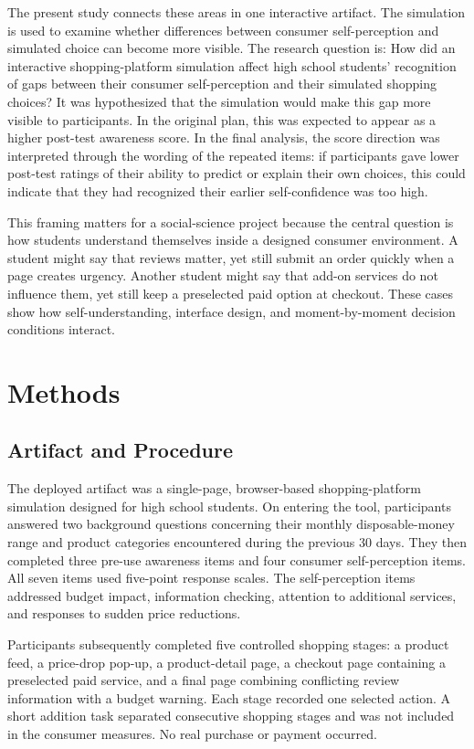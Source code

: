 \documentclass[stu,12pt,floatsintext]{apa7}
\begin{document}
The present study connects these areas in one interactive artifact. The simulation is used to examine whether differences between consumer self-perception and simulated choice can become more visible. The research question is: How did an interactive shopping-platform simulation affect high school students' recognition of gaps between their consumer self-perception and their simulated shopping choices? It was hypothesized that the simulation would make this gap more visible to participants. In the original plan, this was expected to appear as a higher post-test awareness score. In the final analysis, the score direction was interpreted through the wording of the repeated items: if participants gave lower post-test ratings of their ability to predict or explain their own choices, this could indicate that they had recognized their earlier self-confidence was too high.

This framing matters for a social-science project because the central question is how students understand themselves inside a designed consumer environment. A student might say that reviews matter, yet still submit an order quickly when a page creates urgency. Another student might say that add-on services do not influence them, yet still keep a preselected paid option at checkout. These cases show how self-understanding, interface design, and moment-by-moment decision conditions interact.

\section{Methods}

\subsection{Artifact and Procedure}

The deployed artifact was a single-page, browser-based shopping-platform simulation designed for high school students. On entering the tool, participants answered two background questions concerning their monthly disposable-money range and product categories encountered during the previous 30 days. They then completed three pre-use awareness items and four consumer self-perception items. All seven items used five-point response scales. The self-perception items addressed budget impact, information checking, attention to additional services, and responses to sudden price reductions.

Participants subsequently completed five controlled shopping stages: a product feed, a price-drop pop-up, a product-detail page, a checkout page containing a preselected paid service, and a final page combining conflicting review information with a budget warning. Each stage recorded one selected action. A short addition task separated consecutive shopping stages and was not included in the consumer measures. No real purchase or payment occurred.
\end{document}
